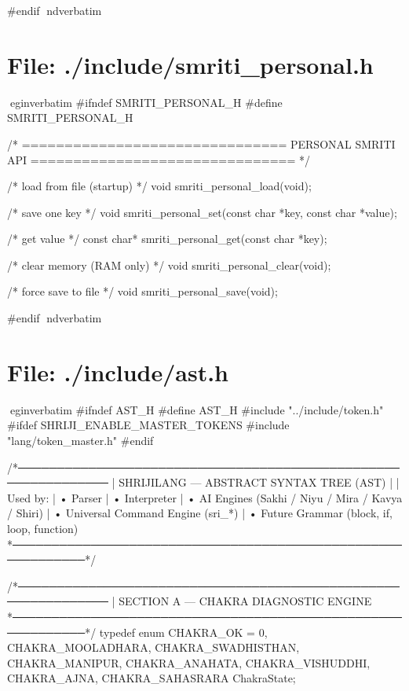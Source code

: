 \documentclass{article}
\begin{document}
#endif
nd{verbatim}
\section*{File: ./include/smriti_personal.h}
egin{verbatim}
#ifndef SMRITI_PERSONAL_H
#define SMRITI_PERSONAL_H

/* ===============================
   PERSONAL SMRITI API
   =============================== */

/* load from file (startup) */
void smriti_personal_load(void);

/* save one key */
void smriti_personal_set(const char *key, const char *value);

/* get value */
const char* smriti_personal_get(const char *key);

/* clear memory (RAM only) */
void smriti_personal_clear(void);

/* force save to file */
void smriti_personal_save(void);

#endif
nd{verbatim}
\section*{File: ./include/ast.h}
egin{verbatim}
#ifndef AST_H
#define AST_H
#include "../include/token.h"
#ifdef SHRIJI_ENABLE_MASTER_TOKENS
#include "lang/token_master.h"
#endif

/*──────────────────────────────────────────────────────────────
 |  SHRIJILANG — ABSTRACT SYNTAX TREE (AST)
 |
 |  Used by:
 |   • Parser
 |   • Interpreter
 |   • AI Engines (Sakhi / Niyu / Mira / Kavya / Shiri)
 |   • Universal Command Engine (sri_*)
 |   • Future Grammar (block, if, loop, function)
 *────────────────────────────────────────────────────────────*/

/*──────────────────────────────────────────────────────────────
 |  SECTION A — CHAKRA DIAGNOSTIC ENGINE
 *────────────────────────────────────────────────────────────*/
typedef enum {
    CHAKRA_OK = 0,
    CHAKRA_MOOLADHARA,
    CHAKRA_SWADHISTHAN,
    CHAKRA_MANIPUR,
    CHAKRA_ANAHATA,
    CHAKRA_VISHUDDHI,
    CHAKRA_AJNA,
    CHAKRA_SAHASRARA
} ChakraState;
\end{document}
